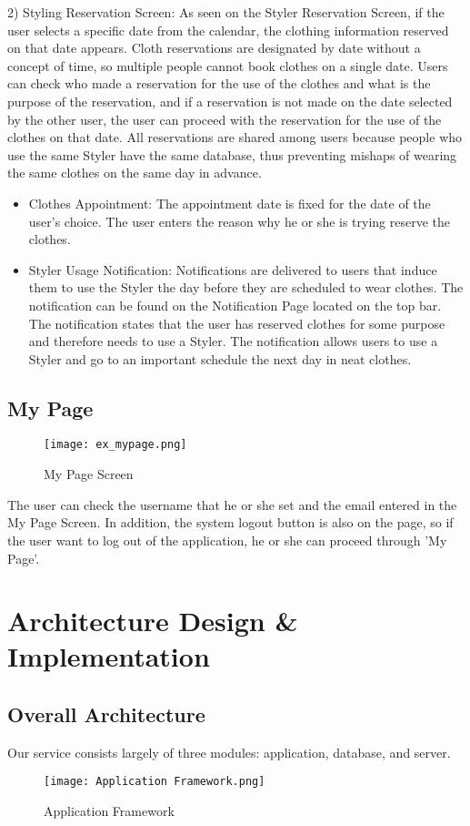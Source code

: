 \documentclass[conference]{IEEEtran}
\begin{document}
2) Styling Reservation Screen: As seen on the Styler Reservation Screen, if the user selects a specific date from the calendar, the clothing information reserved on that date appears. Cloth reservations are designated by date without a concept of time, so multiple people cannot book clothes on a single date. Users can check who made a reservation for the use of the clothes and what is the purpose of the reservation, and if a reservation is not made on the date selected by the other user, the user can proceed with the reservation for the use of the clothes on that date. All reservations are shared among users because people who use the same Styler have the same database, thus preventing mishaps of wearing the same clothes on the same day in advance.
\begin{itemize}
    \item Clothes Appointment: The appointment date is fixed for the date of the user’s choice. The user enters the reason why he or she is trying reserve the clothes.
    \item Styler Usage Notification: Notifications are delivered to users that induce them to use the Styler the day before they are scheduled to wear clothes. The notification can be found on the Notification Page located on the top bar. The notification states that the user has reserved clothes for some purpose and therefore needs to use a Styler. The notification allows users to use a Styler and go to an important schedule the next day in neat clothes.\\
\end{itemize}

\subsection{My Page}
\begin{figure}[htbp]
\centerline{\texttt{[image: ex\_mypage.png]}}
\label{fig}
\caption{My Page Screen}
\end{figure}
The user can check the username that he or she set and the email entered in the My Page Screen. In addition, the system logout button is also on the page, so if the user want to log out of the application, he or she can proceed through 'My Page'.\\


\section{Architecture Design & Implementation}
\subsection{Overall Architecture}
Our service consists largely of three modules: application, database, and server.
\begin{figure}[htbp]
\centerline{\texttt{[image: Application Framework.png]}}
\label{fig}
\caption{Application Framework}
\end{figure}
\end{document}
